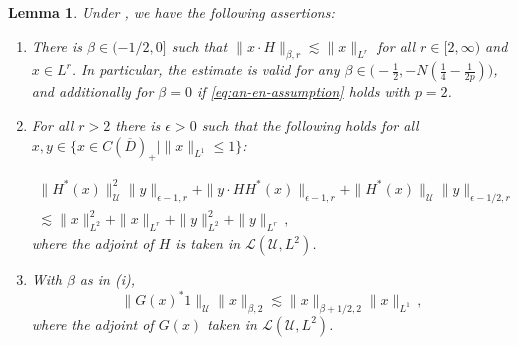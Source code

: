 \documentclass[final]{amsart}
\newtheorem{lem}[thm]{Lemma}
\numberwithin{thm}{section}
\numberwithin{equation}{section}
\newcommand{\U}{\mathcal{U}}
\newcommand{\Ll}{\mathcal{L}}
\newcommand{\cdom}{C(\overline D)_+}
\begin{document}
\begin{lem}\label{SPDE-G-lem}
    Under , we have the following assertions:
    \begin{enumerate}[label=(\roman*)]
        \item There is $\beta \in (-1/2,0]$ such that $\|x \cdot H\|_{\beta,r} \lesssim \|x\|_{L^r}$ for all $r \in [2,\infty)$ and $x \in L^r$. In particular, the estimate is valid for any $\beta \in \big(-\frac{1}{2},  -N(\frac{1}{4} - \frac{1}{2p})\big)$, and additionally for $\beta = 0$ if \eqref{eq:an-en-assumption} holds with $p = 2$.
        \item For all $r > 2$ there is $\epsilon > 0$ such that the following holds for all $x,y \in \{x \in \cdom \mid \|x\|_{L^1} \leq 1\}$: 
        
        
        
        
        
        
        
        \begin{equation}\label{eq:wierd-g}
        \begin{aligned}
        \|H^*(x)\|_\U^2\|y\|_{\epsilon-1,r} + \|y\cdot H H^*(x)\|_{\epsilon-1,r} +\|H^*(x)\|_\U\|y\|_{\epsilon-1/2,r} \\
        \lesssim \|x\|_{L^2}^2 + \|x\|_{L^r} + \|y\|_{L^2}^2 + \|y\|_{L^r}\,,
        \end{aligned}
        \end{equation}
         where the adjoint of $H$ is taken in $\Ll(\U,L^2)$.
        
        
        
         \item With $\beta$ as in (i),
\begin{equation}\label{eq:g-star-1}
    \|G(x)^*1\|_\U\|x\|_{\beta,2} \lesssim \|x\|_{\beta+1/2,2}\|x\|_{L^1} \,,
\end{equation}
where the adjoint of $G(x)$ taken in $\Ll(\U,L^2)$.
    \end{enumerate}
\end{lem}
\end{document}

